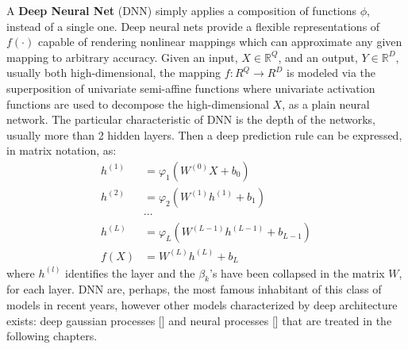 A \textbf{Deep Neural Net} (DNN) simply applies a composition of functions $\phi$, instead of a single one. Deep neural nets provide a flexible representations of $f(\cdot)$ capable of rendering nonlinear mappings which can approximate any given mapping to arbitrary accuracy. Given an input, $X \in \mathbb{R}^Q$, and an output, $Y \in \mathbb{R}^D$, usually both high-dimensional, the mapping $f: {R}^Q \rightarrow {R}^D$ is modeled via the superposition of univariate semi-affine functions where univariate activation functions are used to decompose the high-dimensional $X$, as a plain neural network. The particular characteristic of DNN is the depth of the networks, usually more than 2 hidden layers. Then a deep prediction rule can be expressed, in matrix notation, as:
\begin{align*}
    h^{(1)} &= \varphi_1 \left( W^{(0)}X + b_{0}\right)\\
    h^{(2)} &= \varphi_2 \left( W^{(1)}  h^{(1)} + b_{1}\right)\\
    &\cdots\\
    h^{(L)} &= \varphi_L \left( W^{(L-1)} h^{(L-1)} + b_{L-1}\right)\\
    f(X) &= W^{(L)} h^{(L)} + b_{L}
\end{align*}
where $h^{(l)}$ identifies the layer and the $\beta_k$'s have been collapsed in the matrix $W$, for each layer. DNN are, perhaps, the most famous inhabitant of this class of models in recent years, however other models characterized by deep architecture exists: deep gaussian processes [\cite{Damianou2013, Lee2017}] and neural processes [\cite{Garnelo2018a}] that are treated in the following chapters.

